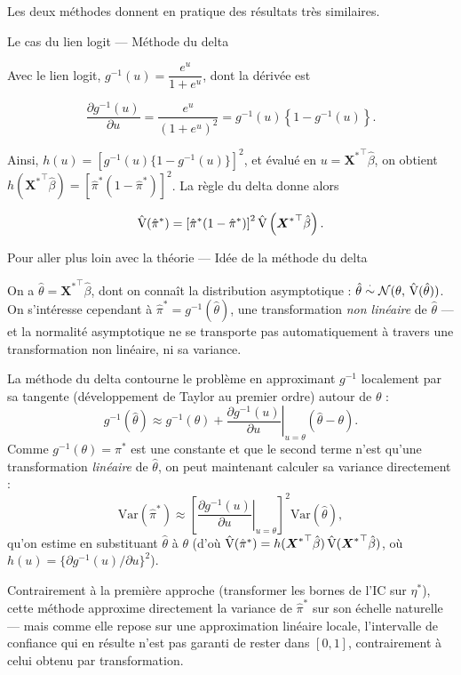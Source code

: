 \documentclass[
  french,
  letterpaper,
  DIV=11,
  numbers=noendperiod]{scrreprt}
\begin{document}
Les deux méthodes donnent en pratique des résultats très similaires.

{Le cas du lien logit --- Méthode du delta}

Avec le lien logit, \(g^{-1}(u) = \dfrac{e^u}{1+e^u}\), dont la dérivée
est

\[
\frac{\partial g^{-1}(u)}{\partial u} = \frac{e^u}{(1+e^u)^2} = g^{-1}(u)\left\{1-g^{-1}(u)\right\}.
\]

Ainsi, \(h(u) = \left[g^{-1}(u)\{1-g^{-1}(u)\}\right]^2\), et évalué en
\(u = {\boldsymbol{X}^*}^\top\hat\beta\), on obtient
\(h({\boldsymbol{X}^*}^\top\hat\beta) = \left[\hat\pi^*(1-\hat\pi^*)\right]^2\).
La règle du delta donne alors

\[
\hat{\text V}(\hat\pi^*) = \left[\hat\pi^*(1-\hat\pi^*)\right]^2 \hat{\text V}\left({\boldsymbol{X}^*}^\top\hat\beta\right).
\]

{Pour aller plus loin avec la théorie --- Idée de la méthode du delta}

On a \(\hat\theta = {\boldsymbol{X}^*}^\top\hat\beta\), dont on connaît
la distribution asymptotique :
\(\hat\theta \overset{\cdot}{\sim} \mathcal{N}(\theta,\, \hat{\text V}(\hat\theta))\).
On s'intéresse cependant à \(\hat\pi^* = g^{-1}(\hat\theta)\), une
transformation \emph{non linéaire} de \(\hat\theta\) --- et la normalité
asymptotique ne se transporte pas automatiquement à travers une
transformation non linéaire, ni sa variance.

La méthode du delta contourne le problème en approximant \(g^{-1}\)
localement par sa tangente (développement de Taylor au premier ordre)
autour de \(\theta\) : \[
g^{-1}(\hat\theta) \approx g^{-1}(\theta) + \left.\frac{\partial g^{-1}(u)}{\partial u}\right|_{u=\theta} (\hat\theta - \theta).
\] Comme \(g^{-1}(\theta) = \pi^*\) est une constante et que le second
terme n'est qu'une transformation \emph{linéaire} de \(\hat\theta\), on
peut maintenant calculer sa variance directement : \[
\text{Var}(\hat\pi^*) \approx \left[\left.\frac{\partial g^{-1}(u)}{\partial u}\right|_{u=\theta}\right]^2 \text{Var}(\hat\theta),
\] qu'on estime en substituant \(\hat\theta\) à \(\theta\) (d'où
\(\hat{\text V}(\hat\pi^*) = h({\boldsymbol{X}^*}^\top\hat\beta)\,\hat{\text V}({\boldsymbol{X}^*}^\top\hat\beta)\),
où \(h(u) = \{\partial g^{-1}(u)/\partial u\}^2\)).

Contrairement à la première approche (transformer les bornes de l'IC sur
\(\eta^*\)), cette méthode approxime directement la variance de
\(\hat\pi^*\) sur son échelle naturelle --- mais comme elle repose sur
une approximation linéaire locale, l'intervalle de confiance qui en
résulte n'est pas garanti de rester dans \([0,1]\), contrairement à
celui obtenu par transformation.
\end{document}
